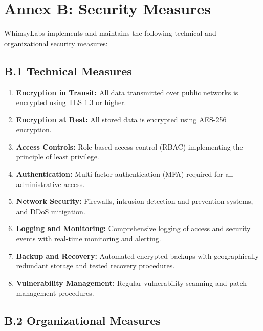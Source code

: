 \documentclass[11pt,a4paper]{article}
\begin{document}
\section*{Annex B: Security Measures}

WhimsyLabs implements and maintains the following technical and organizational security measures:

\subsection*{B.1 Technical Measures}

\begin{enumerate}
    \item \textbf{Encryption in Transit:} All data transmitted over public networks is encrypted using TLS 1.3 or higher.
    
    \item \textbf{Encryption at Rest:} All stored data is encrypted using AES-256 encryption.
    
    \item \textbf{Access Controls:} Role-based access control (RBAC) implementing the principle of least privilege.
    
    \item \textbf{Authentication:} Multi-factor authentication (MFA) required for all administrative access.
    
    \item \textbf{Network Security:} Firewalls, intrusion detection and prevention systems, and DDoS mitigation.
    
    \item \textbf{Logging and Monitoring:} Comprehensive logging of access and security events with real-time monitoring and alerting.
    
    \item \textbf{Backup and Recovery:} Automated encrypted backups with geographically redundant storage and tested recovery procedures.
    
    \item \textbf{Vulnerability Management:} Regular vulnerability scanning and patch management procedures.
\end{enumerate}

\subsection*{B.2 Organizational Measures}
\end{document}
